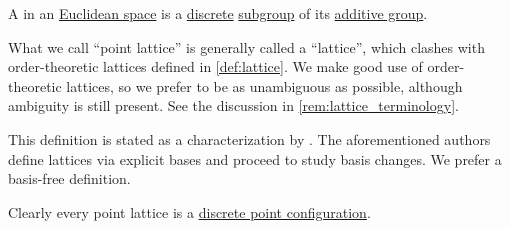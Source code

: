 \begin{definition}\label{def:point_lattice}\mimprovised
  A  in an \hyperref[def:euclidean_space]{Euclidean space} is a \hyperref[def:discrete_set]{discrete} \hyperref[def:group/subobject]{subgroup} of its \hyperref[def:semiring]{additive group}.
\end{definition}
\begin{comments}
  \item What we call \enquote{point lattice} is generally called a \enquote{lattice}, which clashes with order-theoretic lattices defined in \cref{def:lattice}. We make good use of order-theoretic lattices, so we prefer to be as unambiguous as possible, although ambiguity is still present. See the discussion in \cref{rem:lattice_terminology}.

  \item This definition is stated as a characterization by \textcite[thm. 21.2(ii)]{Gruber2007ConvexAndDiscreteGeometry}. The aforementioned authors define lattices via explicit bases and proceed to study basis changes. We prefer a basis-free definition.

  \item Clearly every point lattice is a \hyperref[def:point_configuration]{discrete point configuration}.
\end{comments}

